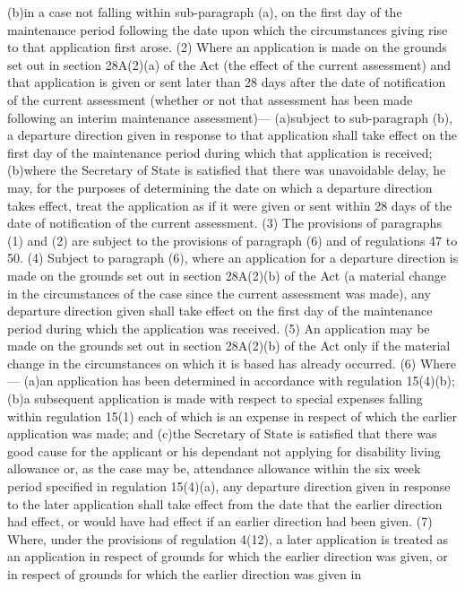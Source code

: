 \documentclass[a4paper]{article}
\begin{document}
(b)in a case not falling within sub-paragraph (a), on the first day of the
maintenance period following the date upon which the circumstances giving rise
to that application first arose.
(2) Where an application is made on the grounds set out in section 28A(2)(a) of
the Act (the effect of the current assessment) and that application is given or
sent later than 28 days after the date of notification of the current assessment
(whether or not that assessment has been made following an interim maintenance
assessment)—
(a)subject to sub-paragraph (b), a departure direction given in response to that
application shall take effect on the first day of the maintenance period during
which that application is received;
(b)where the Secretary of State is satisfied that there was unavoidable delay,
he may, for the purposes of determining the date on which a departure direction
takes effect, treat the application as if it were given or sent within 28 days
of the date of notification of the current assessment.
(3) The provisions of paragraphs (1) and (2) are subject to the provisions of
paragraph (6) and of regulations 47 to 50.
(4) Subject to paragraph (6), where an application for a departure direction is
made on the grounds set out in section 28A(2)(b) of the Act (a material change
in the circumstances of the case since the current assessment was made), any
departure direction given shall take effect on the first day of the maintenance
period during which the application was received.
(5) An application may be made on the grounds set out in section 28A(2)(b) of
the Act only if the material change in the circumstances on which it is based
has already occurred.
(6) Where—
(a)an application has been determined in accordance with regulation 15(4)(b);
(b)a subsequent application is made with respect to special expenses falling
within regulation 15(1) each of which is an expense in respect of which the
earlier application was made; and
(c)the Secretary of State is satisfied that there was good cause for the
applicant or his dependant not applying for disability living allowance or, as
the case may be, attendance allowance within the six week period specified in
regulation 15(4)(a),
any departure direction given in response to the later application shall take
effect from the date that the earlier direction had effect, or would have had
effect if an earlier direction had been given.
(7) Where, under the provisions of regulation 4(12), a later application is
treated as an application in respect of grounds for which the earlier direction
was given, or in respect of grounds for which the earlier direction was given in
\end{document}

